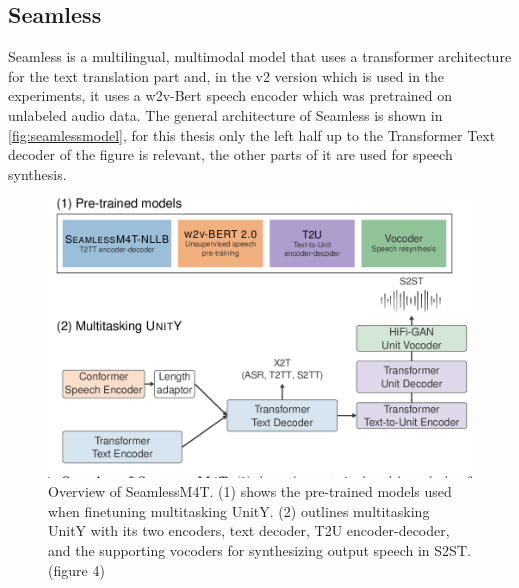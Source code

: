 \subsection{Seamless}
Seamless \cite{seamless2023} is a multilingual, multimodal model that uses a transformer architecture for the text translation part and, in the v2 version which is used in the experiments, it uses a w2v-Bert speech encoder which was pretrained on unlabeled audio data. 
The general architecture of Seamless is shown in \autoref{fig:seamlessmodel}, for this thesis only the left half up to the Transformer Text decoder of the figure is relevant, the other parts of it are used for speech synthesis.

\begin{figure}
        \centering%
        \includegraphics[width=0.7\linewidth]{Latex//sections/images/seamlessmodel.png}
        \caption{Overview of SeamlessM4T. (1) shows the pre-trained models used when finetuning multitasking UnitY. (2) outlines multitasking UnitY with its two encoders, text decoder, T2U encoder-decoder, and the supporting vocoders for synthesizing output speech in S2ST. \cite{seamless2023}(figure 4)}
        \label{fig:seamlessmodel}
\end{figure}

